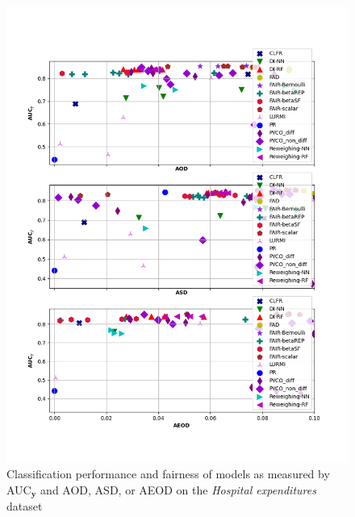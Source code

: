 \documentclass[preprint,12pt]{elsarticle}
\begin{document}
\begin{figure}
	\center
	\includegraphics[angle=0, width=1\textwidth]{MEPS19_all.png}
	\captionsetup{justification=centering}
	\caption{Classification performance and fairness of models as measured by AUC$_\mathbf{y}$ and AOD, ASD, or AEOD on the \textit{Hospital expenditures} dataset}
	\label{fig:MEPS19 all}
	\vskip -0.2in
\end{figure}
\end{document}
